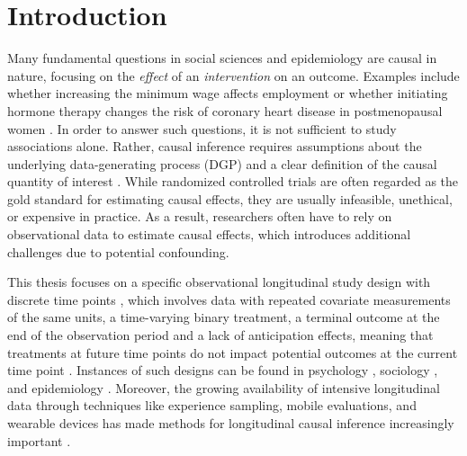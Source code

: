 \chapter{Introduction}
\label{sec:introduction}
Many fundamental questions in social sciences and epidemiology are 
causal in nature, focusing on the \emph{effect} of an \emph{intervention} on an outcome. 
Examples include whether increasing the minimum wage affects employment \cite{cardMinimumWagesEmployment1993} 
or whether initiating hormone therapy changes the risk of coronary heart disease in postmenopausal 
women \cite{hernanObservationalStudiesAnalyzed2008}. In order to answer such questions, it is not sufficient to study 
associations alone. Rather, causal inference requires assumptions about the underlying data-generating process (DGP)
and a clear definition of the causal quantity of interest \cite{greenlandCausalDiagramsEpidemiologic1999, hernanUsingBigData2016}. 
While randomized controlled trials are often regarded as the gold standard for estimating causal effects, 
they are usually infeasible, unethical, or expensive in practice. As a result, researchers often have to rely on 
observational data to estimate causal effects, which introduces additional challenges due to potential confounding.

This thesis focuses on a specific observational longitudinal study design with 
discrete time points \cite{gillCausalInferenceComplex2001}, which involves
data with repeated covariate measurements of the same units, a time-varying binary treatment, 
a terminal outcome at the end of the observation period and a lack of anticipation effects, meaning 
that treatments at future time points do not impact potential outcomes at the current time point \cite{arkhangelskyCausalModelsLongitudinal2024}. 
Instances of such designs can be found in psychology \cite{molinaAssociationStimulantTreatment2023}, sociology \cite{bacakMarginalStructuralModels2015}, and epidemiology \cite{bodnarMarginalStructuralModels2004}. 
Moreover, the growing availability of intensive longitudinal data through techniques like experience sampling, 
mobile evaluations, and wearable devices has made methods for longitudinal causal 
inference increasingly important \cite{myin-germeysExperienceSamplingMethodology2018, shiMetalearningMethodEstimation2025a}.

